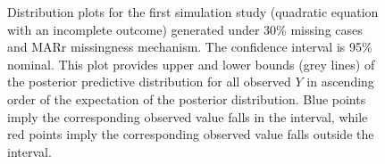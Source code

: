 \documentclass[12pt, fullpage, a4paper]{article}
\begin{document}
\begin{figure}[b]
\begin{center}
{{			}
		}
	\end{center}
	\caption{Distribution plots for the first simulation study (quadratic equation with an incomplete outcome) generated under 30\% missing cases and MARr missingness mechanism. The confidence interval is 95\% nominal. This plot provides upper and lower bounds (grey lines) of the posterior predictive distribution for all observed $Y$ in ascending order of the expectation of the posterior distribution. Blue points imply the corresponding observed value falls in the interval, while red points imply the corresponding observed value falls outside the interval.}
	\label{fig6_2}
\end{figure}

\begin{figure}[t]
	\begin{center}
\end{center}
\end{figure}
\end{document}
